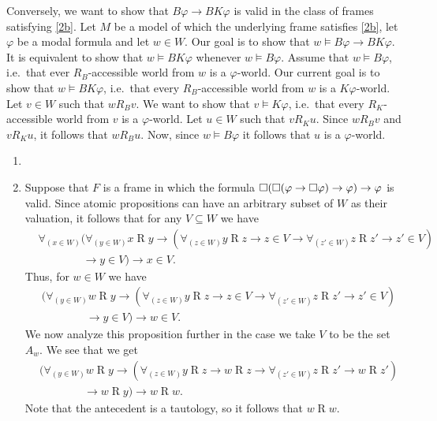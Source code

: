 \documentclass{article}
\begin{document}
\begin{ex}
\begin{enumerate}
Conversely, we want to show that $B\varphi\to BK\varphi$ is valid in the class 
of frames satisfying \ref{2b}. Let $M$ be a model of which the underlying frame
satisfies \ref{2b}, let $\varphi$ be a modal formula and let $w\in W$. Our goal
is to show that $w\models B\varphi\to BK\varphi$. It is equivalent to show that
$w\models BK\varphi$ whenever $w\models B\varphi$. Assume that $w\models B\varphi$,
i.e.~that ever $R_B$-accessible world from $w$ is a $\varphi$-world. Our current
goal is to show that $w\models BK\varphi$, i.e.~that every $R_B$-accessible world
from $w$ is a $K\varphi$-world. Let $v\in W$ such that $w\mathbin{R_B}v$. We
want to show that $v\models K\varphi$, i.e.~that every $R_K$-accessible world from
$v$ is a $\varphi$-world. Let $u\in W$ such that $v\mathbin{R_K} u$. Since
$w\mathbin{R_B} v$ and $v\mathbin{R_K} u$, it follows that $w\mathbin{R_B} u$.
Now, since $w\models B\varphi$ it follows that $u$ is a $\varphi$-world.
\end{enumerate}
\end{ex}

\begin{ex}
\begin{enumerate}
\item
\item Suppose that $F$ is a frame in which the formula 
$\square(\square(\varphi\to\square\varphi)\to\varphi)\to\varphi$ is valid. Since atomic
propositions can have an arbitrary subset of $W$ as their valuation, it follows
that for any $V\subseteq W$ we have
\begin{align*}
& \forall_{(x\in W)}
  (\forall_{(y\in W)} x\mathbin{R}y
  \to (\forall_{(z\in W)} y\mathbin{R}z\to z\in V\to\forall_{(z'\in W)} z\mathbin{R} z'\to z'\in V)
  \\
  & \qquad\qquad \to y\in V) \to x\in V.
\end{align*}
Thus, for $w\in W$ we have
\begin{align*}
& (\forall_{(y\in W)} w\mathbin{R}y
  \to (\forall_{(z\in W)} y\mathbin{R}z\to z\in V\to\forall_{(z'\in W)} z\mathbin{R} z'\to z'\in V)
  \\
  & \qquad\qquad \to y\in V) \to w\in V.
\end{align*}
We now analyze this proposition further in the case we take $V$ to be the
set $A_w$. We see that we get
\begin{align*}
& (\forall_{(y\in W)} w\mathbin{R}y
  \to (\forall_{(z\in W)} y\mathbin{R}z\to w\mathbin{R}z\to\forall_{(z'\in W)} z\mathbin{R} z'\to w\mathbin{R} z')
  \\
  & \qquad\qquad \to w\mathbin{R}y) \to w\mathbin{R} w.
\end{align*}
Note that the antecedent is a tautology, so it follows that $w\mathbin{R} w$.
\end{enumerate}
\end{ex}
\end{document}
